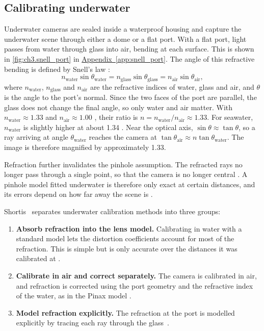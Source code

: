 \subsection{Calibrating underwater}
\label{subsec:ch3.underwater_calib}
Underwater cameras are sealed inside a waterproof housing and capture the underwater scene through either a dome or a flat port.
With a flat port, light passes from water through
 glass into air, bending at each surface. This is shown in \autoref{fig:ch3.snell_port} in \hyperref[app:snell_port]{Appendix~\ref*{app:snell_port}}. The angle of this refractive bending
 is defined by Snell's law \cite{hechtOptics2017}:
\begin{equation}
	n_\text{water} \sin\theta_\text{water} = n_\text{glass} \sin\theta_\text{glass} = n_\text{air} \sin\theta_\text{air} ,
	\label{eq:ch3.snell}
\end{equation}
where $n_\text{water}$, $n_\text{glass}$ and $n_\text{air}$ are the refractive indices of water, glass and air, and $\theta$ is the angle to the port's normal.
 Since the two faces of the port are parallel, the glass does not change the final angle, so only water and air matter.
 With $n_\text{water} \approx 1.33$ and $n_\text{air} \approx 1.00$ \cite{hechtOptics2017}, their ratio is $n = n_\text{water} / n_\text{air} \approx 1.33$.
 For seawater, $n_\text{water}$ is slightly higher at about 1.34 \cite{quanEmpiricalEquationIndex1995}.
 Near the optical axis, $\sin\theta \approx \tan\theta$, so a ray arriving at angle $\theta_\text{water}$ reaches the camera
 at $\tan\theta_\text{air} \approx n \tan\theta_\text{water}$. The image is therefore magnified by approximately 1.33.


Refraction further invalidates the pinhole assumption. The refracted rays no longer pass through a single point, so that the camera is no longer central \cite{treibitzFlatRefractiveGeometry2012}. 
A pinhole model fitted underwater is therefore only exact at certain distances, and its errors depend on how far away the scene is \cite{treibitzFlatRefractiveGeometry2012}.

Shortis~\cite{shortisCalibrationTechniquesAccurate2015} separates underwater calibration methods into three groups:
\begin{enumerate}
	\item \textbf{Absorb refraction into the lens model.} Calibrating in water with a standard model lets the distortion coefficients account for 
	most of the refraction. This is simple but is only accurate over the distances it was calibrated at \cite{shortisCalibrationTechniquesAccurate2015}.
	\item \textbf{Calibrate in air and correct separately.} The camera is calibrated in air, and refraction is corrected using the port geometry and the refractive index of 
	the water, as in the Pinax model \cite{luczynskiPinaxmodelAccurateEfficient2017}.
	\item \textbf{Model refraction explicitly.} The refraction at the port is modelled explicitly by tracing each ray through the glass~\cite{agrawalTheoryMultilayerFlat2012}.
\end{enumerate}

